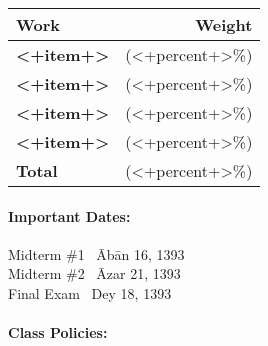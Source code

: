 \documentclass[11pt, a4paper]{article}
\begin{document}
\begin{table}[h]
\begin{tabularx}{\textwidth}{Xr}
\textbf{Work} & \textbf{Weight}\\
\hline
\textbf{<+item+>} & (<+percent+>\%) \\
\textbf{<+item+>} & (<+percent+>\%) \\
\textbf{<+item+>} & (<+percent+>\%) \\
\textbf{<+item+>} & (<+percent+>\%) \\
\hline
\textbf{Total} & (<+percent+>\%) \\
\end{tabularx}
\end{table}

\paragraph{Important Dates:}
\begin{center} \begin{minipage}{3.8in}
\begin{flushleft}
Midterm \#1      \dotfill ~\={A}b\={a}n 16, 1393  \\
Midterm \#2      \dotfill ~\={A}zar 21, 1393  \\
Final Exam       \dotfill ~Dey 18, 1393  \\
\end{flushleft}
\end{minipage}
\end{center}

\paragraph{Class Policies:}  
\end{document}
